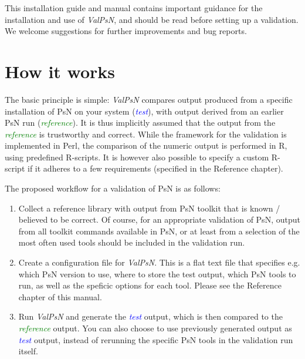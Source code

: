 \documentclass[a4,11pt]{report} \usepackage[pdftex]{graphicx}
\newcommand{\test}{\textcolor{Blue}{\textit{test}}\xspace}
\newcommand{\reference}{\textcolor{Green}{\textit{reference}}\xspace}
\newcommand{\ValPsN}{\textcolor{PiranaOrange}{\textit{ValPsN}}\xspace}
\begin{document}
\vspace{10pt}

\noindent This installation guide and manual contains important
guidance for the installation and use of \ValPsN, and should be read
before setting up a validation. We welcome suggestions for further
improvements and bug reports.

\vspace{10pt}

\section{How it works}
The basic principle is simple: \ValPsN compares output produced from a
specific installation of PsN on your system (\test), with output
derived from an earlier PsN run (\reference). It is thus implicitly
assumed that the output from the \reference is trustworthy and
correct. While the framework for the validation is implemented in
Perl, the comparison of the numeric output is performed in R, using
predefined R-scripts. It is however also possible to
specify a custom R-script if it adheres to a few requirements
(specified in the Reference chapter).

\vspace{10pt}

\noindent The proposed workflow for a validation of PsN is as follows:
\begin{enumerate}
\item Collect a reference library with output from PsN toolkit that is
  known / believed to be correct. Of course, for an appropriate
  validation of PsN, output from all toolkit commands available in PsN, or at
  least from a selection of the most often used tools should be included in
  the validation run.
\item Create a configuration file for \ValPsN. This is a flat text file
  that specifies e.g. which PsN version to use, where to store the
  test output, which PsN tools to run, as well as the speficic options for
  each tool. Please see the Reference chapter of this manual.
\item Run \ValPsN and generate the \test output, which is then
  compared to the \reference output. You can also choose to use
  previously generated output as \test output, instead of rerunning
  the specific PsN tools in the validation run itself.
\end{enumerate}
\end{document}
